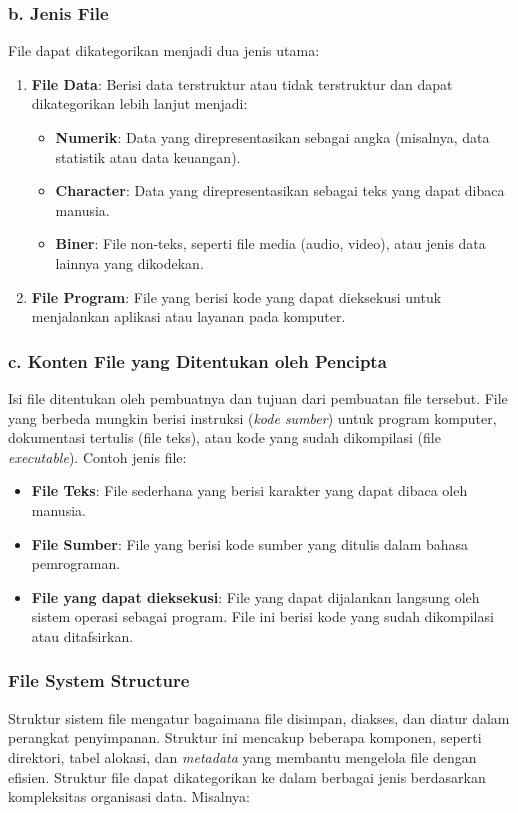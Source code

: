 \documentclass[12pt]{article}
\begin{document}
\subsubsection*{b. Jenis File}
File dapat dikategorikan menjadi dua jenis utama:
\begin{enumerate}
    \item \textbf{File Data}: Berisi data terstruktur atau tidak terstruktur dan dapat dikategorikan lebih lanjut menjadi:
    \begin{itemize}
        \item \textbf{Numerik}: Data yang direpresentasikan sebagai angka (misalnya, data statistik atau data keuangan).
        \item \textbf{Character}: Data yang direpresentasikan sebagai teks yang dapat dibaca manusia.
        \item \textbf{Biner}: File non-teks, seperti file media (audio, video), atau jenis data lainnya yang dikodekan.
    \end{itemize}
    \item \textbf{File Program}: File yang berisi kode yang dapat dieksekusi untuk menjalankan aplikasi atau layanan pada komputer.
\end{enumerate}

\subsubsection*{c. Konten File yang Ditentukan oleh Pencipta}
Isi file ditentukan oleh pembuatnya dan tujuan dari pembuatan file tersebut. File yang berbeda mungkin berisi instruksi (\textit{kode sumber}) untuk program komputer, dokumentasi tertulis (file teks), atau kode yang sudah dikompilasi (file \textit{executable}). Contoh jenis file:
\begin{itemize}
    \item \textbf{File Teks}: File sederhana yang berisi karakter yang dapat dibaca oleh manusia.
    \item \textbf{File Sumber}: File yang berisi kode sumber yang ditulis dalam bahasa pemrograman.
    \item \textbf{File yang dapat dieksekusi}: File yang dapat dijalankan langsung oleh sistem operasi sebagai program. File ini berisi kode yang sudah dikompilasi atau ditafsirkan.
\end{itemize}

\subsubsection{File System Structure}
Struktur sistem file mengatur bagaimana file disimpan, diakses, dan diatur dalam perangkat penyimpanan. Struktur ini mencakup beberapa komponen, seperti direktori, tabel alokasi, dan \textit{metadata} yang membantu mengelola file dengan efisien. Struktur file dapat dikategorikan ke dalam berbagai jenis berdasarkan kompleksitas organisasi data. Misalnya:
\end{document}
